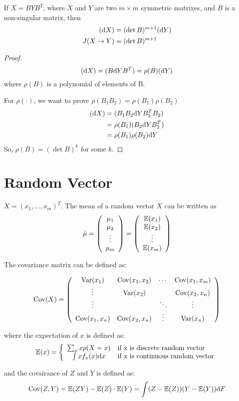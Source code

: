	\begin{theorem}
		If $X = BYB^T$, where $X$ and $Y$ are two $m\times m$ symmetric matrixes, and $B$ is a non-singular matrix, then
		\begin{align*}
			(\mathrm{d} X) &= (\det B)^{m+1} (\mathrm{d} Y)\\
			J(X\to Y) &= (\det B)^{m+1}
		\end{align*}
	\end{theorem}
	\begin{proof}
		$$(\mathrm{d} X) = (B\mathrm{d} Y B^T) = \rho(B)(\mathrm{d} Y)$$
		where $\rho(B)$ is a polynomial of elements of B.
		
		For $\rho(\cdot)$, we want to prove $\rho(B_1B_2) = \rho(B_1)\rho(B_2)$
		\begin{align*}
			(\mathrm{d} X) & = (B_1B_2\mathrm{d} YB_2^TB_2) \\
			&= \rho(B_1)(B_2\mathrm{d} YB_2^T)\\
			& = \rho(B_1)\rho(B_2)\mathrm{d} Y
		\end{align*}
	So, $\rho(B) = (\det B)^k$ for some $k$.
	\end{proof}

\section{Random Vector}

	\begin{definition}
		$X = (x_1, ..., x_m)^T$. The mean of a random vector $X$ can be written as 
		$$\bar{\mu} = \left(
		\begin{array}{c}
			\mu_1\\
			\mu_2\\
			\vdots\\
			\mu_m
		\end{array}
		\right) = \left(
		\begin{array}{c}
			\mathbb{E}(x_1)\\
			\mathbb{E}(x_2)\\
			\vdots\\
			\mathbb{E}(x_m)
		\end{array}
		\right)$$
		
		The covariance matrix can be defined as:
		
		$$\mathrm{Cov}(X) = \left(\begin{array}{cccc}
			\mathrm{Var}(x_1) & \mathrm{Cov}(x_1, x_2) & \cdots & \mathrm{Cov}(x_1, x_m)\\
			\vdots & \mathrm{Var}(x_2) & & \mathrm{Cov}(x_2, x_n)\\
			\vdots & &\ddots&\vdots\\
			\mathrm{Cov}(x_1, x_n) & \mathrm{Cov}(x_2,x_n)&\vdots & \mathrm{Var}(x_n) 
		\end{array}\right)$$
	
	where the expectation of $x$ is defined as:
	$$
	\mathbb{E}(x) = \left\{
	\begin{array}{cl}
		\sum_{x}xp(X = x) & \text{if x is discrete random vector}\\
		\int xf_x(x)\mathrm{d} x & \text{if x is continuous random vector}
	\end{array}
	\right.$$
	
	and the covairance of $Z$ and $Y$ is defined as:
	$$\mathrm{Cov}(Z, Y) = \mathbb{E}(ZY) - \mathbb{E}(Z)\cdot \mathbb{E}(Y) = \int (Z - \mathbb{E}(Z))(Y - \mathbb{E}(Y))\mathrm{d} F$$ 
	\end{definition}


